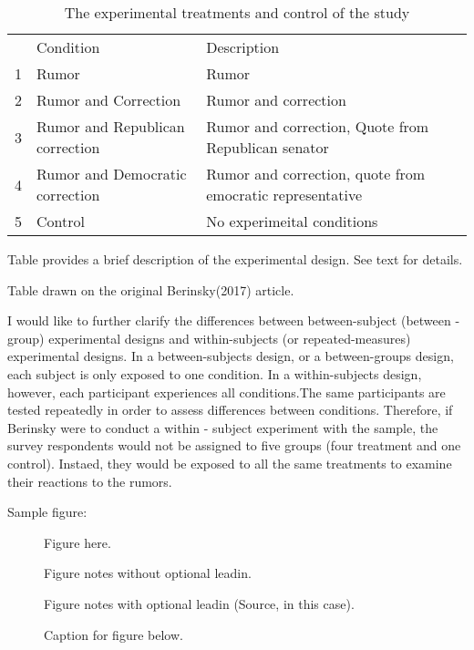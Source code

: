 \documentclass[AER]{AEA}
\begin{document}
\begin{table}[h!]
\caption{The experimental treatments and control of the study}

\begin{tabular}{lll}
& Condition & Description \\
1 & Rumor & Rumor \\
2 & Rumor and Correction & Rumor and correction \\
3 & Rumor and Republican correction & Rumor and correction, Quote from Republican senator \\
4 & Rumor and Democratic correction & Rumor and correction, quote from emocratic representative \\
5 & Control & No experimeital conditions
\end{tabular}
\begin{tablenotes}
Table provides a brief description of the experimental design. See text for details.
\end{tablenotes}
\begin{tablenotes}[Source]
Table drawn on the original Berinsky(2017) article.
\end{tablenotes}
\end{table}

I would like to further clarify the differences between between-subject
(between - group) experimental designs and within-subjects (or
repeated-measures) experimental designs. In a between-subjects design,
or a between-groups design, each subject is only exposed to one
condition. In a within-subjects design, however, each participant
experiences all conditions.The same participants are tested repeatedly
in order to assess differences between conditions. Therefore, if
Berinsky were to conduct a within - subject experiment with the sample,
the survey respondents would not be assigned to five groups (four
treatment and one control). Instaed, they would be exposed to all the
same treatments to examine their reactions to the rumors.

Sample figure:

\begin{figure}
Figure here.

\caption{Caption for figure below.}
\begin{figurenotes}
Figure notes without optional leadin.
\end{figurenotes}
\begin{figurenotes}[Source]
Figure notes with optional leadin (Source, in this case).
\end{figurenotes}
\end{figure}
\end{document}
